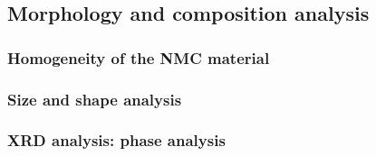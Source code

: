 \documentclass{article}
\begin{document}
{\begin{itemize}
\subsection{Morphology and composition analysis}
\subsubsection{Homogeneity of the NMC material}
\subsubsection{Size and shape analysis}
\subsubsection{XRD analysis: phase analysis}


\end{itemize}}
\end{document}
